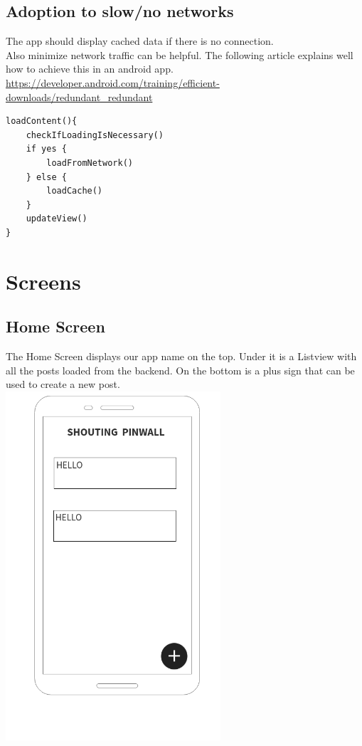 \documentclass[conference]{IEEEtran}
\numberwithin{figure}{subsection}
\begin{document}
\subsection{Adoption to slow/no networks}
The app should display cached data if there is no connection.\\

Also minimize network traffic can be helpful. The following article explains well how to achieve this in an android app.
\url{https://developer.android.com/training/efficient-downloads/redundant_redundant}

\begin{lstlisting}
loadContent(){
    checkIfLoadingIsNecessary()
    if yes {
        loadFromNetwork()
    } else {
        loadCache()
    }
    updateView()
}
\end{lstlisting}


\section{Screens}
\subsection{Home Screen}
The Home Screen displays our app name on the top. Under it is a Listview with all the posts loaded from the backend. On the bottom is a plus sign that can be used to create a new post.\\
\includegraphics[width=8cm]{bibtex/images/Home_Screen.png}
\end{document}
